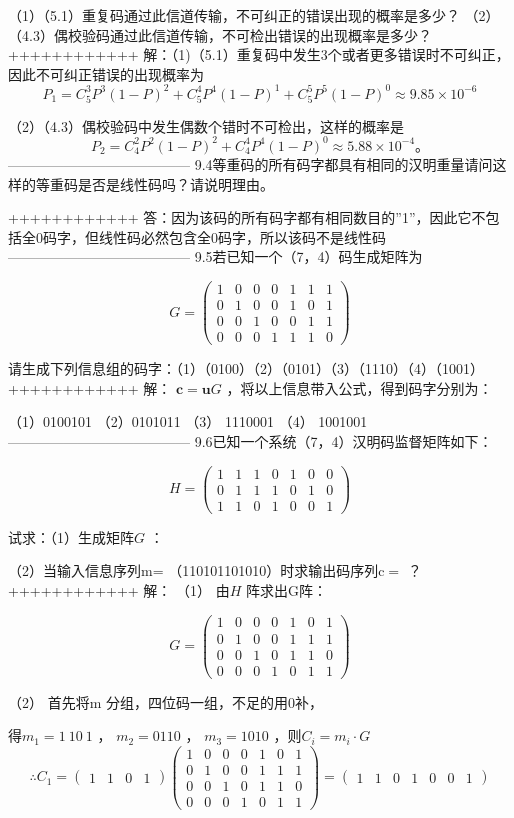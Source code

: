\documentclass[utf8]{article}
\begin{document}
（1）（5.1）重复码通过此信道传输，不可纠正的错误出现的概率是多少？ 
（2）（4.3）偶校验码通过此信道传输，不可检出错误的出现概率是多少？
++++++++++++
解：（1)（5.1）重复码中发生3个或者更多错误时不可纠正，因此不可纠正错误的出现概率为
$$P_{1}=C_{5}^{3}P^{3}(1-P)^{2}+C_{5}^{4}P^{4}(1-P)^{1}+C_{5}^{5}P^{5}(1-P)^{0}\approx9.85\times10^{-6}$$

（2）（4.3）偶校验码中发生偶数个错时不可检出，这样的概率是
$$P_{2}=C_{4}^{2}P^{2}(1-P)^{2}+C_{4}^{4}P^{4}(1-P)^{0}\approx5.88\times10^{-4}。$$
---------------------------------------
9.4等重码的所有码字都具有相同的汉明重量请问这样的等重码是否是线性码吗？请说明理由。



++++++++++++
答：因为该码的所有码字都有相同数目的”1”，因此它不包括全0码字，但线性码必然包含全0码字，所以该码不是线性码
---------------------------------------
9.5若已知一个（7，4）码生成矩阵为

$$G=\begin{pmatrix}1&0&0&0&1&1&1\\0&1&0&0&1&0&1\\0&0&1&0&0&1&1\\0&0&0&1&1&1&0\end{pmatrix}$$

请生成下列信息组的码字：（1）（0100）（2）（0101）（3）（1110）（4）（1001）
++++++++++++
解： $\mathbf{c}=\mathbf{u}G$ ，将以上信息带入公式，得到码字分别为：

（1）0100101 （2）0101011 （3） 1110001 （4） 1001001 
---------------------------------------
9.6已知一个系统（7，4）汉明码监督矩阵如下：

$$H=\begin{pmatrix}1&1&1&0&1&0&0\\0&1&1&1&0&1&0\\1&1&0&1&0&0&1\end{pmatrix}$$

试求：（1）生成矩阵$G$ ：

（2）当输入信息序列m= （110101101010）时求输出码序列$\mathrm{c=}$ ？
++++++++++++
解： （1） 由$H$ 阵求出G阵：

$$G=\begin{pmatrix}1&0&0&0&1&0&1\\0&1&0&0&1&1&1\\0&0&1&0&1&1&0\\0&0&0&1&0&1&1\end{pmatrix}$$

（2） 首先将m 分组，四位码一组，不足的用0补，

得$m_{1}=1\:10\:1$ ， $m_2=0110$ ， $m_3=1010$ ，则$C_{i}=m_{i}\cdot G$
$$\therefore C_1=\begin{pmatrix}1&1&0&1\end{pmatrix}\begin{pmatrix}1&0&0&0&1&0&1\\0&1&0&0&1&1&1\\0&0&1&0&1&1&0\\0&0&0&1&0&1&1\end{pmatrix}=\begin{pmatrix}1&1&0&1&0&0&1\end{pmatrix}$$
\end{document}
